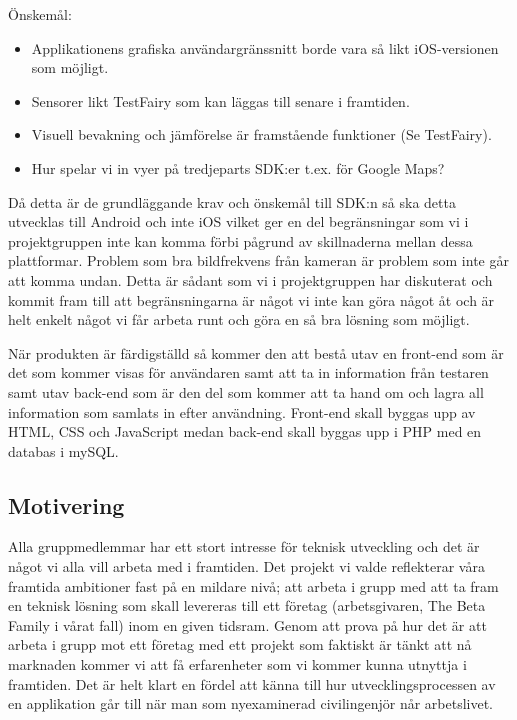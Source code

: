 Önskemål:

\begin{itemize}
	\item Applikationens grafiska användargränssnitt borde vara så likt iOS-versionen som möjligt.
	\item Sensorer likt TestFairy som kan läggas till senare i framtiden.
	\item Visuell bevakning och jämförelse är framstående funktioner (Se TestFairy).
	\item Hur spelar vi in vyer på tredjeparts SDK:er t.ex. för Google Maps?
\end{itemize}


Då detta är de grundläggande krav och önskemål till SDK:n så ska detta utvecklas till Android och inte iOS vilket ger en del begränsningar som vi i projektgruppen inte kan komma förbi pågrund av skillnaderna mellan dessa plattformar. Problem som bra bildfrekvens från kameran är problem som inte går att komma undan. Detta är sådant som vi i projektgruppen har diskuterat och kommit fram till att begränsningarna är något vi inte kan göra något åt och är helt enkelt något vi får arbeta runt och göra en så bra lösning som möjligt.

När produkten är färdigställd så kommer den att bestå utav en front-end som är det som kommer visas för användaren samt att ta in information från testaren samt utav back-end som är den del som kommer att ta hand om och lagra all information som samlats in efter användning. Front-end skall byggas upp av HTML, CSS och JavaScript medan back-end skall byggas upp i PHP med en databas i mySQL. \parencite{catalog}

\subsection{Motivering}
Alla gruppmedlemmar har ett stort intresse för teknisk utveckling och det är något vi alla vill arbeta med i framtiden. Det projekt vi valde reflekterar våra framtida ambitioner fast på en mildare nivå; att arbeta i grupp med att ta fram en teknisk lösning som skall levereras till ett företag (arbetsgivaren, The Beta Family i vårat fall) inom en given tidsram. Genom att prova på hur det är att arbeta i grupp mot ett företag med ett projekt som faktiskt är tänkt att nå marknaden kommer vi att få erfarenheter som vi kommer kunna utnyttja i framtiden. Det är helt klart en fördel att känna till hur utvecklingsprocessen av en applikation går till när man som nyexaminerad civilingenjör når arbetslivet.

